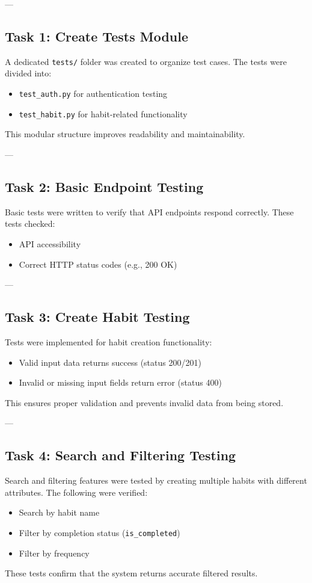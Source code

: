 \documentclass[12pt]{article}
\begin{document}
---

\subsection{Task 1: Create Tests Module}
A dedicated \texttt{tests/} folder was created to organize test cases. The tests were divided into:
\begin{itemize}
    \item \texttt{test\_auth.py} for authentication testing
    \item \texttt{test\_habit.py} for habit-related functionality
\end{itemize}
This modular structure improves readability and maintainability.

---

\subsection{Task 2: Basic Endpoint Testing}
Basic tests were written to verify that API endpoints respond correctly. These tests checked:
\begin{itemize}
    \item API accessibility
    \item Correct HTTP status codes (e.g., 200 OK)
\end{itemize}

---

\subsection{Task 3: Create Habit Testing}
Tests were implemented for habit creation functionality:
\begin{itemize}
    \item Valid input data returns success (status 200/201)
    \item Invalid or missing input fields return error (status 400)
\end{itemize}
This ensures proper validation and prevents invalid data from being stored.

---

\subsection{Task 4: Search and Filtering Testing}
Search and filtering features were tested by creating multiple habits with different attributes. The following were verified:
\begin{itemize}
    \item Search by habit name
    \item Filter by completion status (\texttt{is\_completed})
    \item Filter by frequency
\end{itemize}
These tests confirm that the system returns accurate filtered results.
\end{document}
